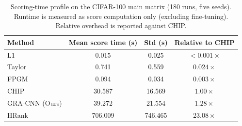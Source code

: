 \begin{table}[t]
\caption{Scoring-time profile on the CIFAR-100 main matrix (180 runs, five seeds). Runtime is measured as score computation only (excluding fine-tuning). Relative overhead is reported against CHIP.}
\label{tab:runtime_profile}
\small
\begin{tabular*}{\linewidth}{@{\extracolsep\fill}lccc}
\toprule
Method & Mean score time (s) & Std (s) & Relative to CHIP \\
\midrule
L1 & 0.015 & 0.025 & $<0.001\times$ \\
Taylor & 0.741 & 0.559 & $0.024\times$ \\
FPGM & 0.094 & 0.034 & $0.003\times$ \\
CHIP & 30.587 & 16.569 & $1.00\times$ \\
GRA-CNN (Ours) & 39.272 & 21.554 & $1.28\times$ \\
HRank & 706.009 & 746.465 & $23.08\times$ \\
\bottomrule
\end{tabular*}
\end{table}

